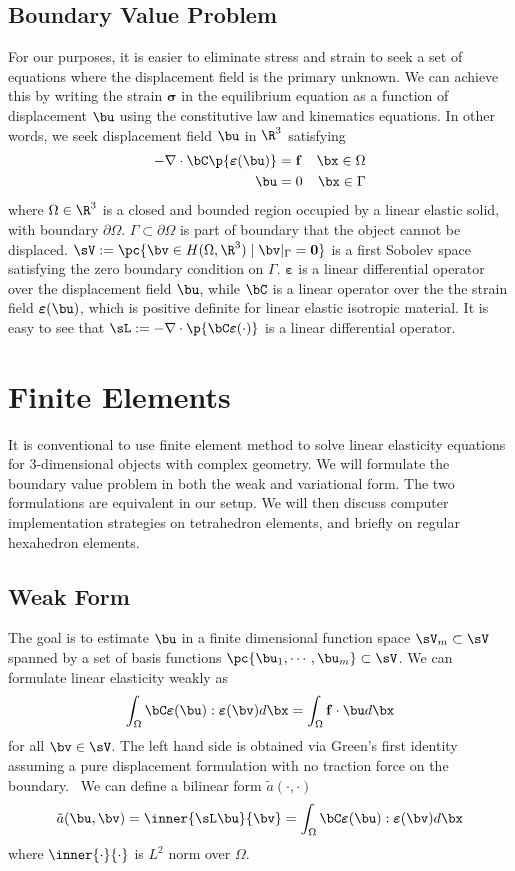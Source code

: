 \documentclass[11pt,titlepage]{article}
\newcommand{\bsigma}{\boldsymbol{\sigma}}
\newcommand{\bepsilon}{\boldsymbol{\varepsilon}}
\renewcommand{\bf}{\mathbf{f}}
\newcommand{\ta}{\tilde{a}}
\begin{document}
\subsection{Boundary Value Problem}
For our purposes, it is easier to eliminate stress and strain to seek a set of equations where the displacement field is the primary unknown. We can achieve this by writing the strain $\bsigma$ in the equilibrium equation as a function of displacement $\bu$ using the constitutive law and kinematics equations. In other words, we seek displacement field $\bu$ in $\R^3$ satisfying
\begin{align*}
    -\nabla \cdot \bC \p{\bepsilon(\bu)}
        &= \bf & \bx\in\Omega \\
    \bu &= 0   &\bx\in\Gamma
\end{align*}
where $\Omega\in\R^3$ is a closed and bounded region occupied by a linear elastic solid, with boundary $\partial\Omega$. $\Gamma \subset \partial\Omega$ is part of boundary that the object cannot be displaced. $\sV := \pc{\bv\in H(\Omega,\R^3) \mid \bv|_{\Gamma} = \mathbf{0}}$ is a first Sobolev space satisfying the zero boundary condition on $\Gamma$. $\bepsilon$ is a linear differential operator over the displacement field $\bu$, while $\bC$ is a linear operator over the the strain field $\bepsilon(\bu)$, which is positive definite for linear elastic isotropic material. It is easy to see that $\sL := -\nabla \cdot \p{\bC \bepsilon(\cdot)}$ is a linear differential operator. 

\section{Finite Elements}
It is conventional to use finite element method to solve linear elasticity equations for 3-dimensional objects with complex geometry. We will formulate the boundary value problem in both the weak and variational form. The two formulations are equivalent in our setup. We will then discuss computer implementation strategies on tetrahedron elements, and briefly on regular hexahedron elements.

\subsection{Weak Form}
The goal is to estimate $\bu$ in a finite dimensional function space $\sV_m\subset\sV$ spanned by a set of basis functions $\pc{\bu_1, \cdots, \bu_m} \subset \sV$. We can formulate linear elasticity weakly as
\[
    \int_{\Omega} \bC\bepsilon(\bu) : \bepsilon(\bv) d\bx
    = 
    \int_{\Omega} \bf \cdot \bu d\bx
\]
for all $\bv \in\sV$. The left hand side is obtained via Green's first identity assuming a pure displacement formulation with no traction force on the boundary.~\cite{multigrid_preconditioning_thesis_2016} We can define a bilinear form $\ta(\cdot,\cdot)$
\[
    \ta(\bu,\bv) = \inner{\sL \bu}{\bv}
        = \int_{\Omega} \bC \bepsilon(\bu) : \bepsilon(\bv) d\bx    
\]
where $\inner{\cdot}{\cdot}$ is $L^2$ norm over $\Omega$. 
\end{document}
